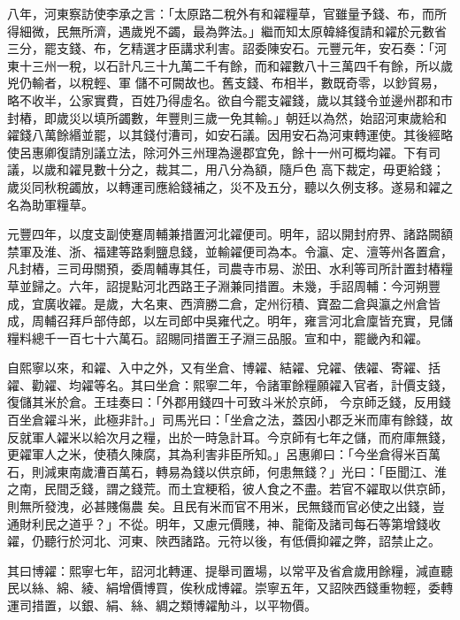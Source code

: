 \begin{pinyinscope}
 八年，河東察訪使李承之言：「太原路二稅外有和糴糧草，官雖量予錢、布，而所得細微，民無所濟，遇歲兇不蠲，最為弊法。」繼而知太原韓絳復請和糴於元數省三分，罷支錢、布，乞精選才臣講求利害。詔委陳安石。元豐元年，安石奏：「河東十三州一稅，以石計凡三十九萬二千有餘，而和糴數八十三萬四千有餘，所以歲兇仍輸者，以稅輕、軍
 儲不可闕故也。舊支錢、布相半，數既奇零，以鈔貿易，略不收半，公家實費，百姓乃得虛名。欲自今罷支糴錢，歲以其錢令並邊州郡和市封樁，即歲災以填所蠲數，年豐則三歲一免其輸。」朝廷以為然，始詔河東歲給和糴錢八萬餘緡並罷，以其錢付漕司，如安石議。因用安石為河東轉運使。其後經略使呂惠卿復請別議立法，除河外三州理為邊郡宜免，餘十一州可概均糴。下有司議，以歲和糴見數十分之，裁其二，用八分為額，隨戶色
 高下裁定，毋更給錢；歲災同秋稅蠲放，以轉運司應給錢補之，災不及五分，聽以久例支移。遂易和糴之名為助軍糧草。



 元豐四年，以度支副使蹇周輔兼措置河北糴便司。明年，詔以開封府界、諸路闕額禁軍及淮、浙、福建等路剩鹽息錢，並輸糴便司為本。令瀛、定、澶等州各置倉，凡封樁，三司毋關預，委周輔專其任，司農寺市易、淤田、水利等司所計置封樁糧草並歸之。六年，詔提點河北西路王子淵兼同措置。未幾，手詔周輔：今河朔豐
 成，宜廣收糴。是歲，大名東、西濟勝二倉，定州衍積、寶盈二倉與瀛之州倉皆成，周輔召拜戶部侍郎，以左司郎中吳雍代之。明年，雍言河北倉廩皆充實，見儲糧料總千一百七十六萬石。詔賜同措置王子淵三品服。宣和中，罷畿內和糴。



 自熙寧以來，和糴、入中之外，又有坐倉、博糴、結糴、兌糴、俵糴、寄糴、括糴、勸糴、均糴等名。其曰坐倉：熙寧二年，令諸軍餘糧願糴入官者，計價支錢，復儲其米於倉。王珪奏曰：「外郡用錢四十可致斗米於京師，
 今京師乏錢，反用錢百坐倉糴斗米，此極非計。」司馬光曰：「坐倉之法，蓋因小郡乏米而庫有餘錢，故反就軍人糴米以給次月之糧，出於一時急計耳。今京師有七年之儲，而府庫無錢，更糴軍人之米，使積久陳腐，其為利害非臣所知。」呂惠卿曰：「今坐倉得米百萬石，則減東南歲漕百萬石，轉易為錢以供京師，何患無錢？」光曰：「臣聞江、淮之南，民間乏錢，謂之錢荒。而土宜粳稻，彼人食之不盡。若官不糴取以供京師，則無所發洩，必甚賤傷農
 矣。且民有米而官不用米，民無錢而官必使之出錢，豈通財利民之道乎？」不從。明年，又慮元價賤，神、龍衛及諸司每石等第增錢收糴，仍聽行於河北、河東、陜西諸路。元符以後，有低價抑糴之弊，詔禁止之。



 其曰博糴：熙寧七年，詔河北轉運、提舉司置場，以常平及省倉歲用餘糧，減直聽民以絲、綿、綾、絹增價博買，俟秋成博糴。崇寧五年，又詔陜西錢重物輕，委轉運司措置，以銀、絹、絲、綢之類博糴觔斗，以平物價。




\end{pinyinscope}
